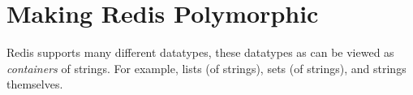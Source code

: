 \newcommand{\framedhslinecorrect}[2]%
  {#1[#2]}

\newcommand{\framedhs}{\sethscode{framedhscode}}


\newenvironment{inlinehscode}%
  {\(\def\column##1##2{}%
   \let\>\undefined\let\<\undefined\let\\\undefined
   \newcommand\>[1][]{}\newcommand\<[1][]{}\newcommand\\[1][]{}%
   \def\fromto##1##2##3{##3}%
   \def\nextline{}}{\) }%

\newcommand{\inlinehs}{\sethscode{inlinehscode}}


\newenvironment{joincode}%
  {\let\orighscode=\hscode
   \let\origendhscode=\endhscode
   \def\endhscode{\def\hscode{\endgroup\def\@currenvir{hscode}\\}\begingroup}
   \orighscode\def\hscode{\endgroup\def\@currenvir{hscode}}}%
  {\origendhscode
   \global\let\hscode=\orighscode
   \global\let\endhscode=\origendhscode}%

\makeatother
\EndFmtInput
%

%
\makeatletter

\let\Varid\mathit
\let\Conid\mathsf

\def\commentbegin{\quad\{\ }
\def\commentend{\}}

\newcommand{\ty}[1]{\Conid{#1}}
\newcommand{\con}[1]{\Conid{#1}}
\newcommand{\id}[1]{\Varid{#1}}
\newcommand{\cl}[1]{\Varid{#1}}
\newcommand{\opsym}[1]{\mathrel{#1}}

\newcommand\Keyword[1]{\textbf{\textsf{#1}}}
\newcommand\Hide{\mathbin{\downarrow}}
\newcommand\Reveal{\mathbin{\uparrow}}




\makeatother
\EndFmtInput

\section{Making Redis Polymorphic}
\label{sec:polymorphic-redis}

Redis supports many different datatypes, these datatypes as can be viewed as
 \emph{containers} of strings. For example, lists (of strings),
 sets (of strings), and strings themselves.


